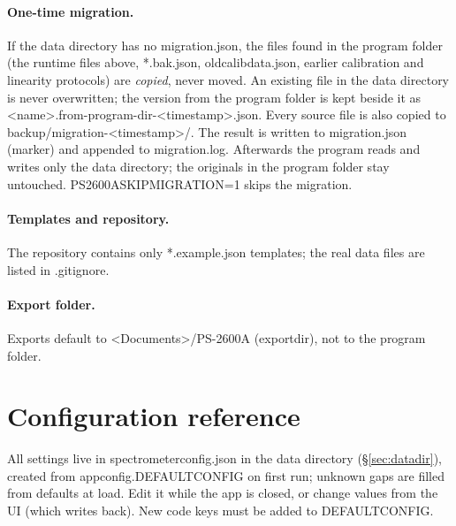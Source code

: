 \documentclass[12pt,a4paper]{article}
\DeclareRobustCommand{\code}[1]{{\ttfamily\small\def\_{\rawus\allowbreak}#1}}
\DeclareRobustCommand{\file}[1]{{\ttfamily\small\def\_{\rawus\allowbreak}#1}}
\DeclareRobustCommand{\key}[1]{{\ttfamily\small\color{acc2}\def\_{\rawus\allowbreak}#1}}
\begin{document}
\paragraph{One-time migration.} If the data directory has no
\file{migration.json}, the files found in the program folder (the runtime files
above, \file{*.bak.json}, \file{old\_calib\_data\_*.json}, earlier calibration and
linearity protocols) are \emph{copied}, never moved. An existing file in the data
directory is never overwritten; the version from the program folder is kept
beside it as \file{<name>.from-program-dir-<timestamp>.json}. Every source file
is also copied to \file{backup/migration-<timestamp>/}. The result is written to
\file{migration.json} (marker) and appended to \file{migration.log}. Afterwards
the program reads and writes only the data directory; the originals in the
program folder stay untouched. \code{PS2600A\_SKIP\_MIGRATION=1} skips the
migration.

\paragraph{Templates and repository.} The repository contains only
\file{*.example.json} templates; the real data files are listed in
\file{.gitignore}.

\paragraph{Export folder.} Exports default to
\file{<Documents>/PS-2600A} (\key{export\_dir}), not to the program folder.

\section{Configuration reference}
All settings live in \file{spectrometer\_config.json} in the data directory (\S\ref{sec:datadir}), created from
\code{app\_config.DEFAULT\_CONFIG} on first run; unknown gaps are filled from
defaults at load. Edit it while the app is closed, or change values from the UI
(which writes back). New code keys must be added to \code{DEFAULT\_CONFIG}.
\end{document}
